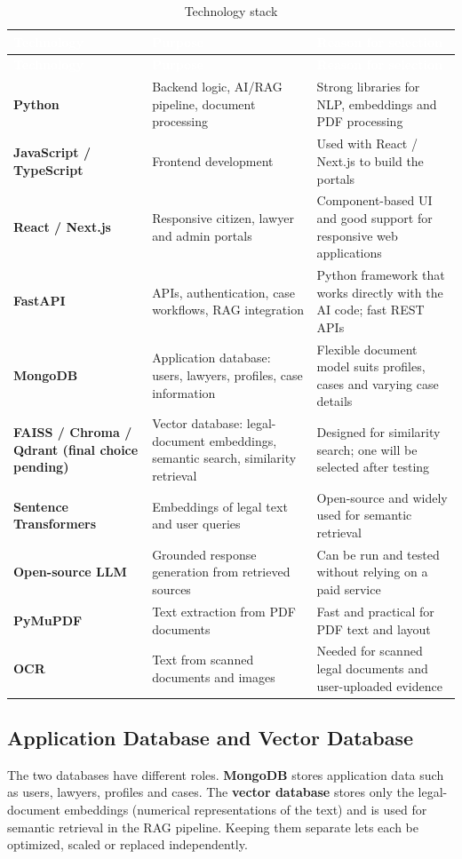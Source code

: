 \documentclass[12pt,a4paper]{report}
\newcommand{\thd}[1]{\textcolor{white}{\textbf{#1}}}
\newcommand{\headrow}{\rowcolor{tablehead}}
\begin{document}
\begin{longtable}{|L{3.6cm}|L{5.0cm}|L{5.4cm}|}
\caption{Technology stack}\label{tab:tech}\\
\hline
\headrow \thd{Technology} & \thd{Purpose} & \thd{Reason for selection} \\ \hline
\endfirsthead
\hline
\headrow \thd{Technology} & \thd{Purpose} & \thd{Reason for selection} \\ \hline
\endhead
\textbf{Python} & Backend logic, AI/RAG pipeline, document processing & Strong libraries for NLP, embeddings and PDF processing \\ \hline
{}\textbf{JavaScript / TypeScript} & Frontend development & Used with React / Next.js to build the portals \\ \hline
\textbf{React / Next.js} & Responsive citizen, lawyer and admin portals & Component-based UI and good support for responsive web applications \\ \hline
{}\textbf{FastAPI} & APIs, authentication, case workflows, RAG integration & Python framework that works directly with the AI code; fast REST APIs \\ \hline
\textbf{MongoDB} & Application database: users, lawyers, profiles, case information & Flexible document model suits profiles, cases and varying case details \\ \hline
{}\textbf{FAISS / Chroma / Qdrant (final choice pending)} & Vector database: legal-document embeddings, semantic search, similarity retrieval & Designed for similarity search; one will be selected after testing \\ \hline
\textbf{Sentence Transformers} & Embeddings of legal text and user queries & Open-source and widely used for semantic retrieval \\ \hline
{}\textbf{Open-source LLM} & Grounded response generation from retrieved sources & Can be run and tested without relying on a paid service \\ \hline
\textbf{PyMuPDF} & Text extraction from PDF documents & Fast and practical for PDF text and layout \\ \hline
{}\textbf{OCR} & Text from scanned documents and images & Needed for scanned legal documents and user-uploaded evidence \\ \hline
\end{longtable}

\subsection*{Application Database and Vector Database}
The two databases have different roles. \textbf{MongoDB} stores application data such as users, lawyers, profiles and cases. The \textbf{vector database} stores only the legal-document embeddings (numerical representations of the text) and is used for semantic retrieval in the RAG pipeline. Keeping them separate lets each be optimized, scaled or replaced independently.
\end{document}
